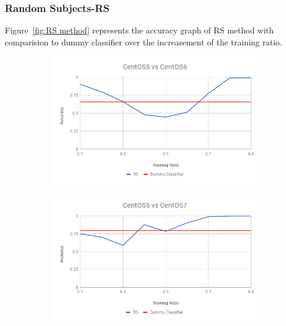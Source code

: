 \documentclass[10pt, conference, compsocconf]{IEEEtran}
\begin{document}
\subsubsection{Random Subjects-RS}
Figure~\ref{fig:RS method} represents
the accuracy graph of RS method with comparision to dummy
classifier over the increasement of the training ratio.
\begin{figure}[h!]
        \centering
        \begin{subfigure}[b]{0.8\linewidth}
                \includegraphics[width=\columnwidth]{figures/ALS/RS-ALS-5vs6-PFS}
        \end{subfigure}
        \begin{subfigure}[b]{0.8\linewidth}
                \includegraphics[width=\columnwidth]{figures/ALS/RS-ALS-5vs7-PFS}
        \end{subfigure}
        \begin{subfigure}[b]{0.8\linewidth}

\end{subfigure}
\end{figure}
\end{document}
